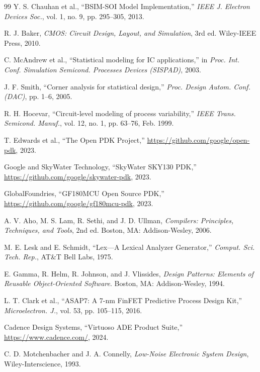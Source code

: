 \documentclass[10pt,twocolumn]{article}
\begin{document}
\begin{thebibliography}{99}
Y. S. Chauhan et al., ``BSIM-SOI Model Implementation,''
\textit{IEEE J. Electron Devices Soc.}, vol. 1, no. 9, pp. 295--305, 2013.

R. J. Baker, \textit{CMOS: Circuit Design, Layout, and Simulation}, 3rd ed.
Wiley-IEEE Press, 2010.

C. McAndrew et al., ``Statistical modeling for IC applications,''
in \textit{Proc. Int. Conf. Simulation Semicond. Processes Devices (SISPAD)}, 2003.

J. F. Smith, ``Corner analysis for statistical design,''
\textit{Proc. Design Autom. Conf. (DAC)}, pp. 1--6, 2005.

R. H. Hocevar, ``Circuit-level modeling of process variability,''
\textit{IEEE Trans. Semicond. Manuf.}, vol. 12, no. 1, pp. 63--76, Feb. 1999.

T. Edwards et al., ``The Open PDK Project,''
\url{https://github.com/google/open-pdk}, 2023.

Google and SkyWater Technology, ``SkyWater SKY130 PDK,''
\url{https://github.com/google/skywater-pdk}, 2023.

GlobalFoundries, ``GF180MCU Open Source PDK,''
\url{https://github.com/google/gf180mcu-pdk}, 2023.

A. V. Aho, M. S. Lam, R. Sethi, and J. D. Ullman, \textit{Compilers: Principles, Techniques, and Tools}, 
2nd ed. Boston, MA: Addison-Wesley, 2006.

M. E. Lesk and E. Schmidt, ``Lex---A Lexical Analyzer Generator,''
\textit{Comput. Sci. Tech. Rep.}, AT\&T Bell Labs, 1975.

E. Gamma, R. Helm, R. Johnson, and J. Vlissides, \textit{Design Patterns: Elements of Reusable Object-Oriented Software}.
Boston, MA: Addison-Wesley, 1994.

L. T. Clark et al., ``ASAP7: A 7-nm FinFET Predictive Process Design Kit,''
\textit{Microelectron. J.}, vol. 53, pp. 105--115, 2016.

Cadence Design Systems, ``Virtuoso ADE Product Suite,''
\url{https://www.cadence.com/}, 2024.

C. D. Motchenbacher and J. A. Connelly, \textit{Low-Noise Electronic System Design},
Wiley-Interscience, 1993.

\end{thebibliography}
\end{document}
